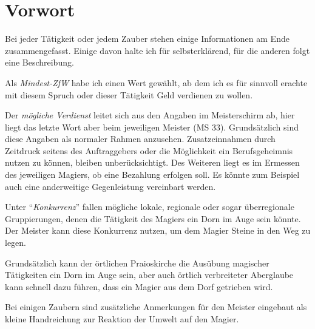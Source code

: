 \section{Vorwort}
Bei jeder Tätigkeit oder jedem Zauber stehen einige Informationen am Ende zusammengefasst. Einige davon halte ich für selbsterklärend, für die anderen folgt eine Beschreibung.

Als \textit{Mindest-ZfW} habe ich einen Wert gewählt, ab dem ich es für sinnvoll erachte mit diesem Spruch oder dieser Tätigkeit Geld verdienen zu wollen.

Der \textit{mögliche Verdienst} leitet sich aus den Angaben im Meisterschirm ab, hier liegt das letzte Wort aber beim jeweiligen Meister (MS 33). Grundsätzlich sind diese Angaben als normaler Rahmen anzusehen. Zusatzeinnahmen durch Zeitdruck seitens des Auftraggebers oder die Möglichkeit ein Berufsgeheimnis nutzen zu können, bleiben unberücksichtigt. Des Weiteren liegt es im Ermessen des jeweiligen Magiers, ob eine Bezahlung erfolgen soll. Es könnte zum Beispiel auch eine anderweitige Gegenleistung vereinbart werden.

Unter \enquote{\textit{Konkurrenz}} fallen mögliche lokale, regionale oder sogar überregionale Gruppierungen, denen die Tätigkeit des Magiers ein Dorn im Auge sein könnte. Der Meister kann diese Konkurrenz nutzen, um dem Magier Steine in den Weg zu legen.

Grundsätzlich kann der örtlichen Praioskirche die Ausübung magischer Tätigkeiten ein Dorn im Auge sein, aber auch örtlich verbreiteter Aberglaube kann schnell dazu führen, dass ein Magier aus dem Dorf getrieben wird.

Bei einigen Zaubern sind zusätzliche Anmerkungen für den Meister eingebaut als kleine Handreichung zur Reaktion der Umwelt auf den Magier.
